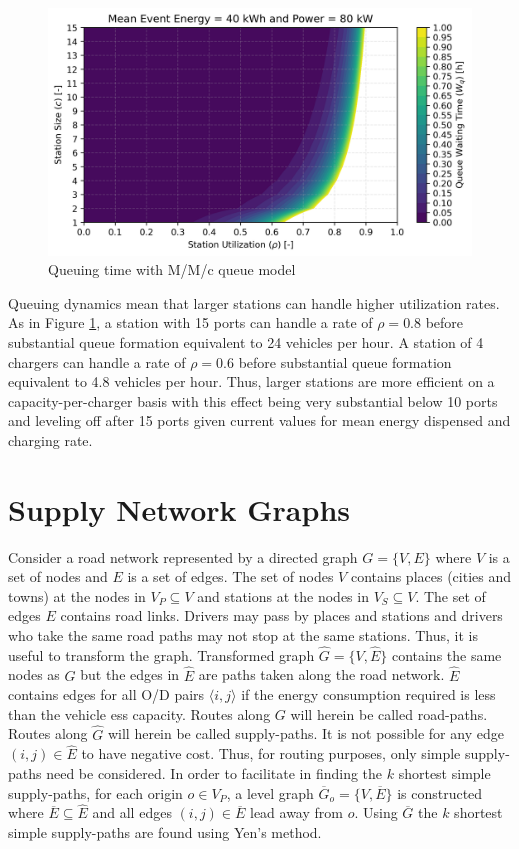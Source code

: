 \documentclass[12pt]{article}
\begin{document}
\begin{figure}[H]
	\centering
	\includegraphics[width = .7\linewidth]{figs/queue.png}
	\caption{Queuing time with M/M/c queue model}
	\label{fig:queue}
\end{figure}

Queuing dynamics mean that larger stations can handle higher utilization rates. As in Figure \ref{fig:queue}, a station with 15 ports can handle a rate of $\rho = 0.8$ before substantial queue formation equivalent to 24 vehicles per hour. A station of 4 chargers can handle a rate of $\rho = 0.6$ before substantial queue formation equivalent to 4.8 vehicles per hour. Thus, larger stations are more efficient on a capacity-per-charger basis with this effect being very substantial below 10 ports and leveling off after 15 ports given current values for mean energy dispensed and charging rate.

\section{Supply Network Graphs}

Consider a road network represented by a directed graph $G = \{V, E\}$ where $V$ is a set of nodes and $E$ is a set of edges. The set of nodes $V$ contains places (cities and towns) at the nodes in $V_P \subseteq V$ and stations at the nodes in $V_S \subseteq V$. The set of edges $E$ contains road links. Drivers may pass by places and stations and drivers who take the same road paths may not stop at the same stations. Thus, it is useful to transform the graph. Transformed graph $\hat{G} = \{V, \hat{E}\}$ contains the same nodes as $G$ but the edges in $\hat{E}$ are paths taken along the road network. $\hat{E}$ contains edges for all O/D pairs $\langle i, j \rangle$ if the energy consumption required is less than the vehicle \gls{ess} capacity. Routes along $G$ will herein be called road-paths. Routes along $\hat{G}$ will herein be called supply-paths. It is not possible for any edge $(i, j) \in \hat{E}$ to have negative cost. Thus, for routing purposes, only simple supply-paths need be considered. In order to facilitate in finding the $k$ shortest simple supply-paths, for each origin $o \in V_P$, a level graph $\overline{G}_o = \{V, \overline{E}\}$ is constructed where $\overline{E} \subseteq \hat{E}$ and all edges $(i, j) \in \overline{E}$ lead away from $o$. Using $\overline{G}$ the $k$ shortest simple supply-paths are found using Yen's method.
\end{document}
